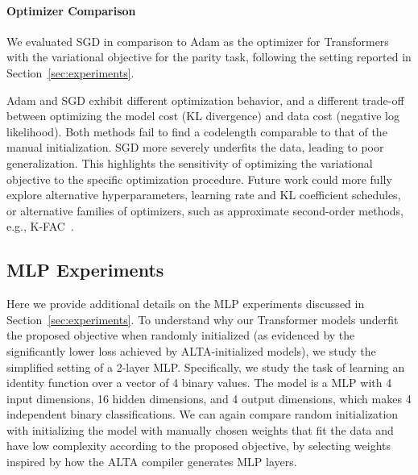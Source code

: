 \paragraph{Optimizer Comparison} We evaluated SGD in comparison to Adam as the optimizer for Transformers with the variational objective for the parity task, following the setting reported in Section~\ref{sec:experiments}.

\begin{table}[h]
    \centering
    \caption{Comparison of Adam and SGD for optimizing variational objective.}
\vspace{0.15cm}
\end{table}

Adam and SGD exhibit different optimization behavior, and a different trade-off between optimizing the model cost (KL divergence) and data cost (negative log likelihood). Both methods fail to find a codelength comparable to that of the manual initialization. SGD more severely underfits the data, leading to poor generalization.
This highlights the sensitivity of optimizing the variational objective to the specific optimization procedure. Future work could more fully explore alternative hyperparameters, learning rate and KL coefficient schedules, or alternative families of optimizers, such as approximate second-order methods, e.g., K-FAC~\citep{martens2015optimizing}.

\subsection{MLP Experiments}
\label{sec:mlp-experiments}

Here we provide additional details on the MLP experiments discussed in Section~\ref{sec:experiments}.
To understand why our Transformer models underfit the proposed objective when randomly initialized (as evidenced by the significantly lower loss achieved by ALTA-initialized models), we study the simplified setting of a 2-layer MLP. Specifically, we study the task of learning an identity function over a vector of 4 binary values. The model is a MLP with 4 input dimensions, 16 hidden dimensions, and 4 output dimensions, which makes 4 independent binary classifications.
We can again compare random initialization with initializing the model with manually chosen weights that fit the data and have low complexity according to the proposed objective, by selecting weights inspired by how the ALTA compiler generates MLP layers. 


